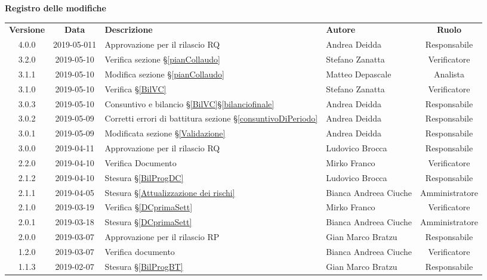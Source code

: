 	\begin{center}
		\textbf{Registro delle modifiche}
	\end{center}
	\begin{center}
		\begin{tabularx}{\textwidth}{|c|c|X|X|c|}
			\hline
			\textbf{Versione} & \textbf{Data} & \textbf{Descrizione} & \textbf{Autore} & \textbf{Ruolo} \\
			4.0.0 & 2019-05-011 & Approvazione per il rilascio RQ & Andrea Deidda & Responsabile \\
			\hline 3.2.0&2019-05-10& Verifica sezione \S\ref{pianCollaudo}&Stefano Zanatta& Verificatore\\
			\hline 3.1.1&2019-05-10&Modifica sezione \S\ref{pianCollaudo}&Matteo Depascale& Analista\\
			\hline
			3.1.0 & 2019-05-10 & Verifica \S\ref{BilVC} & Stefano Zanatta & Verificatore \\
			\hline
			3.0.3 & 2019-05-10 & Consuntivo e bilancio \S\ref{BilVC}\S\ref{bilanciofinale} & Andrea Deidda & Responsabile \\
			\hline
			3.0.2 & 2019-05-09 & Corretti errori di battitura sezione \S\ref{consuntivoDiPeriodo} & Andrea Deidda & Responsabile \\
			\hline
			3.0.1 & 2019-05-09 & Modificata sezione \S\ref{Validazione} & Andrea Deidda & Responsabile \\
			\hline
			3.0.0 &2019-04-11&Approvazione per il rilascio RQ & Ludovico Brocca & Responsabile\\
			\hline
			2.2.0 &2019-04-10&Verifica Documento& Mirko Franco & Verificatore\\
			\hline
			2.1.2 &2019-04-10&Stesura \S\ref{BilProgDC}& Ludovico Brocca & Responsabile\\
			\hline
			2.1.1 & 2019-04-05 & Stesura  \S\ref{Attualizzazione dei rischi} & Bianca Andreea Ciuche & Amministratore \\		
			\hline
			2.1.0 &2019-03-19&Verifica  \S\ref{DCprimaSett}& Mirko Franco & Verificatore\\
			\hline
			2.0.1 & 2019-03-18 & Stesura  \S\ref{DCprimaSett} & Bianca Andreea Ciuche & Amministratore \\
			\hline
			2.0.0 & 2019-03-07 & Approvazione per il rilascio RP & Gian Marco Bratzu & Responsabile \\
			\hline
			1.2.0 & 2019-03-07 & Verifica documento & Bianca Andreea Ciuche & Verificatore \\
			\hline
			1.1.3 & 2019-02-07 & Stesura \S\ref{BilProgBT} & Gian Marco Bratzu & Responsabile \\

\end{tabularx}
\end{center}
